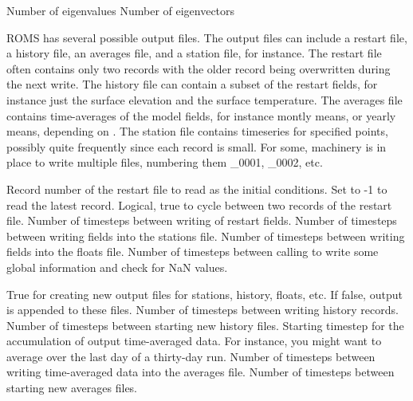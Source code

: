 \begin{klist}
     \begin{klist}
        Number of eigenvalues
        Number of eigenvectors
     \end{klist}
     ROMS has several
   possible output files.  The output files can
   include a restart file, a history file, an averages file, and a
   station file, for instance.  The restart file often contains
   only two records with the older record being overwritten during
   the next write.  The history file can contain a subset of the
   restart fields, for instance just the surface elevation and the
   surface temperature.  The averages file contains time-averages
   of the model fields, for instance montly means, or yearly means,
   depending on .  The station file contains timeseries
   for specified points, possibly quite frequently since each record
   is small. For some, machinery is in place to write multiple
   files, numbering them \_0001, \_0002, etc.
     \begin{klist}
            Record number of the restart file to read
     as the initial conditions. Set to -1 to read the latest record.
        Logical, true to cycle between two records
     of the restart file.
             Number of timesteps between writing of
     restart fields.
             Number of timesteps between writing fields
     into the stations file.
             Number of timesteps between writing fields
     into the floats file.
            Number of timesteps between calling
        to write some global information and check for
       NaN values. 
     \end{klist}
    \mbox{}
     \begin{klist}
        True for creating new output files for
       stations, history, floats, etc. If false, output is appended
       to these files.
         Number of timesteps between writing history
       records.
         Number of timesteps between starting new history
       files.
           Starting timestep for the accumulation of
     output time-averaged data.  For instance, you might want to average
     over the last day of a thirty-day run.
             Number of timesteps between writing
     time-averaged data into the averages file.
             Number of timesteps between starting
     new averages files.

\end{klist}
\end{klist}
